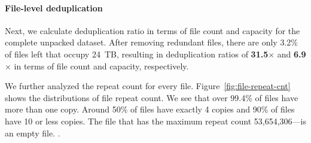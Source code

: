\paragraph{File-level deduplication}
%
Next, we calculate deduplication ratio in terms of file count and capacity for
the complete unpacked dataset.
%
After removing redundant files, there are only 3.2\% of files left that occupy
24~TB, resulting in deduplication ratios of \textbf{31.5$\times$} and
\textbf{6.9$\times$} in terms of file count and capacity, respectively.
%

%
We further analyzed the repeat count for every file.
%
Figure~\ref{fig:file-repeat-cnt} shows the distributions of file repeat count.  
%
We see that over 99.4\% of files have more than one copy.
%
Around 50\% of files have exactly 4 copies and 90\% of files have 10 or less
copies. 
%
The file that has the maximum repeat count 53,654,306---is an empty file.
%
.
%
